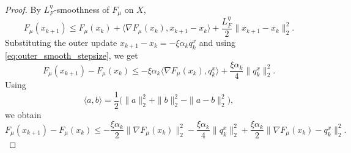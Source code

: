 \documentclass{article}
\begin{document}
\begin{proof}
By \(L_F^\eta\)-smoothness of \(F_\mu\) on \(X\),
\[
F_\mu(x_{k+1})
\le
F_\mu(x_k)
+
\langle \nabla F_\mu(x_k),x_{k+1}-x_k\rangle
+
\frac{L_F^\eta}{2}\|x_{k+1}-x_k\|_2^2 .
\]
Substituting the outer update \(x_{k+1}-x_k=-\xi\alpha_k q_k^x\) and using
\eqref{eq:outer_smooth_stepsize}, we get
\[
F_\mu(x_{k+1})-F_\mu(x_k)
\le
-\xi\alpha_k\langle \nabla F_\mu(x_k),q_k^x\rangle
+
\frac{\xi\alpha_k}{4}\|q_k^x\|_2^2 .
\]
Using
\[
\langle a,b\rangle
=
\frac12\bigl(\|a\|_2^2+\|b\|_2^2-\|a-b\|_2^2\bigr),
\]
we obtain
\begin{equation}
\label{eq:outer_basic_descent}
F_\mu(x_{k+1})-F_\mu(x_k)
\le
-\frac{\xi\alpha_k}{2}\|\nabla F_\mu(x_k)\|_2^2
-\frac{\xi\alpha_k}{4}\|q_k^x\|_2^2
+
\frac{\xi\alpha_k}{2}\|\nabla F_\mu(x_k)-q_k^x\|_2^2 .
\end{equation}


\end{proof}
\end{document}
